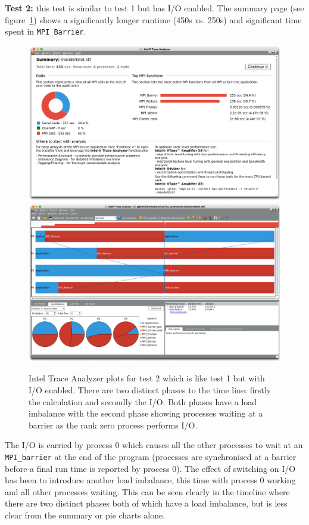 \documentclass[a4paper,titlepage]{article}
\begin{document}
\noindent
\textbf{Test 2:} this test is similar to test 1 but has I/O enabled. The summary page (see figure~\ref{fig:test2_ITAC_summary}) shows a significantly longer runtime (450s vs. 250s) and significant time spent in \verb+MPI_Barrier+. 
\begin{figure}[htbp]
\begin{center}
\includegraphics[scale=0.3]{figures/test2_summary}
\includegraphics[scale=0.3]{figures/test2_eventTimeline}
\caption{Intel Trace Analyzer plots for test 2 which is like test 1 but with I/O enabled. There are two distinct phases to the time line: firstly the calculation and secondly the I/O. Both phases have a load imbalance with the second phase showing processes waiting at a barrier as the rank zero process performs I/O.}
\label{fig:test2_ITAC_summary}
\end{center}
\end{figure}
The I/O is carried by process 0 which causes all the other processes to wait at an \verb+MPI_barrier+ at the end of the program (processes are synchronised at a barrier before a final run time is reported by process 0). The effect of switching on I/O has been to introduce another load imbalance, this time with process 0 working and all other processes waiting. This can be seen clearly in the timeline where there are two distinct phases both of which have a load imbalance, but is less clear from the summary or pie charts alone. \\
\end{document}
